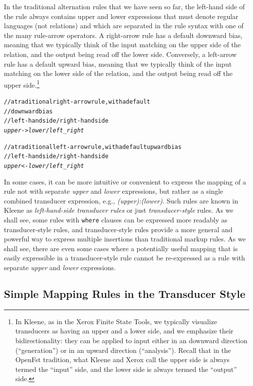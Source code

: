 In the traditional alternation rules that we have seen so far, the
left-hand side of the rule always contains upper and lower expressions
that must denote regular languages (not relations) and which are
separated in the rule syntax with one of the many rule-arrow operators.
A right-arrow rule has a default downward bias, meaning that we typically
think of the input matching on the upper side of the relation, and the
output being read off the lower side.  Conversely, a left-arrow rule has
a default upward bias, meaning that we typically think of the input
matching on the lower side of the relation, and the output being read off
the upper side.\footnote{In Kleene, as in the Xerox Finite State Tools,
	we typically visualize transducers as having an upper and a lower
	side, and we emphasize their bidirectionality: they can be applied to
	input either in an downward direction (``generation'') or in an
	upward direction (``analysis'').  Recall that in the OpenFst
	tradition, what Kleene and Xerox call the upper side is always termed
the ``input'' side, and the lower side is always termed the ``output''
side.}

\begin{alltt}
// a traditional right-arrow rule, with a default 
//    downward bias
// left-hand side / right-hand side
\emph{upper} -> \emph{lower} / \emph{left} _ \emph{right}

// a traditional left-arrow rule, with a default upward bias
// left-hand side / right-hand side
\emph{upper} <- \emph{lower} / \emph{left} _ \emph{right}
\end{alltt}

In some cases, it can be more intuitive or convenient to express the
mapping of a rule not with separate \emph{upper} and \emph{lower}
expressions, but rather as a single combined transducer expression, e.g.,
\emph{(upper):(lower)}.  Such rules are known in Kleene as
\emph{left-hand-side transducer rules} or just \emph{transducer-style}
rules.  As we shall see, some rules with \texttt{where} clauses can be
expressed more readably as transducer-style rules, and transducer-style
rules provide a more general and powerful way to express multiple insertions than
traditional markup rules.  As we shall see, there are even some cases
where a potentially useful mapping that is easily expressible in a
transducer-style rule cannot be re-expressed as a rule with separate
\emph{upper} and \emph{lower} expressions.

\subsection{Simple Mapping Rules in the Transducer Style}

